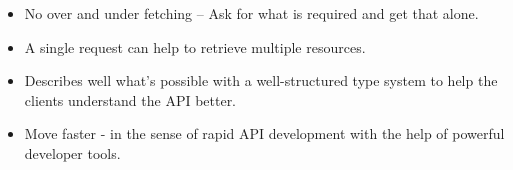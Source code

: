 \documentclass[../main.tex]{subfiles}
\begin{document}
\begin{itemize}
\item No over and under fetching – Ask for what is required and get that alone.
\item A single request can help to retrieve multiple resources.
\item Describes well what’s possible with a well-structured type system to help the clients understand the API better.
\item Move faster - in the sense of rapid API development with the help of powerful developer tools.
\end{itemize}

\printglossaries
\end{document}
